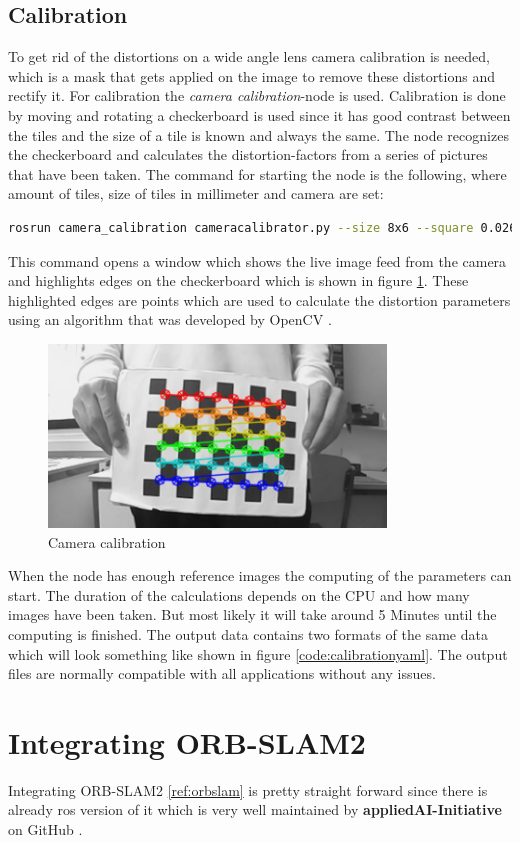 \subsection{Calibration}
To get rid of the distortions on a wide angle lens camera calibration is needed, which is a mask that gets applied on the image to remove these distortions and rectify it.
For calibration the \textit{camera calibration}-node is used.  Calibration is done by moving and rotating a checkerboard is used since it has good contrast between the tiles and the size of a tile is known and always the same. The node recognizes the checkerboard and calculates the distortion-factors from a series of pictures that have been taken.\newline
The command for starting the node is the following, where amount of tiles, size of tiles in millimeter and camera are set:
\begin{lstlisting}[language=BASH,caption={Start Calibration Node}]
rosrun camera_calibration cameracalibrator.py --size 8x6 --square 0.026 --no-service-check image:=/camera/image_raw camera:=/camera
\end{lstlisting}

This command opens a window which shows the live image feed from the camera and highlights edges on the checkerboard which is shown in figure \ref{cameracalibration}. These highlighted edges are points which are used to calculate the distortion parameters using an algorithm that was developed by OpenCV \cite{cameracalibrationopencv}.
\begin{figure}[h]
	\centering
	\includegraphics[width=0.8\textwidth]{./media/images/CameraCalibration.png}
  	\caption{Camera calibration}
  	\label{cameracalibration}
\end{figure} \newline

When the node has enough reference images the computing of the parameters can start. The duration of the calculations depends on the CPU and how many images have been taken. But most likely it will take around 5 Minutes until the computing is finished. The output data contains two formats of the same data which will look something like shown in figure \ref{code:calibrationyaml}. The output files are normally compatible with all applications without any issues.


\section{Integrating ORB-SLAM2}
Integrating ORB-SLAM2 \ref{ref:orbslam} is pretty straight forward since there is already \gls{ros} version of it which is very well maintained by \textbf{appliedAI-Initiative} on GitHub \cite{orbslam2rosgithub}.